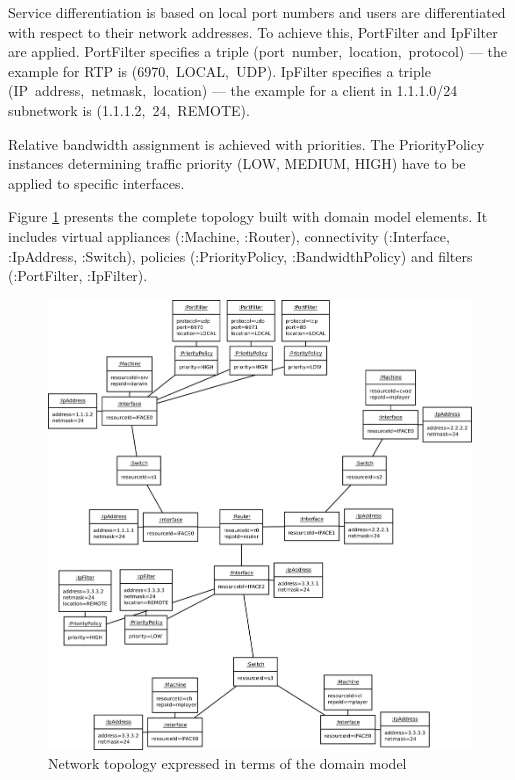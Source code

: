 \documentclass[11pt]{book}
\begin{document}
        Service differentiation is based on local port numbers and users are differentiated with respect to their
        network addresses. To achieve this, PortFilter and IpFilter are applied. PortFilter specifies a triple
        \mbox{(port number, location, protocol)} --- the example for RTP is \mbox{(6970, LOCAL, UDP)}. IpFilter
        specifies a triple \mbox{(IP address, netmask, location)} --- the example for a client in 1.1.1.0/24 subnetwork
        is \mbox{(1.1.1.2, 24, REMOTE)}.

        Relative bandwidth assignment is achieved with priorities. The PriorityPolicy instances determining traffic
        priority (LOW, MEDIUM, HIGH) have to be applied to specific interfaces.

        Figure \ref{fig:cs:topo} presents the complete topology built with domain model elements. It includes virtual
        appliances (:Machine, :Router), connectivity (:Interface, :IpAddress, :Switch), policies (:PriorityPolicy,
        :BandwidthPolicy) and filters (:PortFilter, :IpFilter).

        \begin{figure}[H]
          \includegraphics[width=.9\textwidth]{img/test-case/topology-om.pdf}

          \caption{Network topology expressed in terms of the domain model}
          \label{fig:cs:topo}
        \end{figure}
\end{document}
